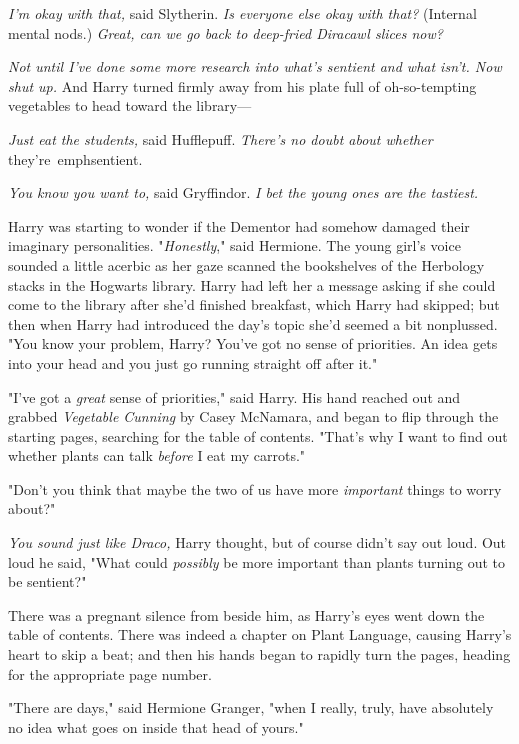 \emph{I'm okay with that,} said Slytherin. \emph{Is everyone else okay with 
that?} (Internal mental nods.) \emph{Great, can we go back to deep-fried 
Diracawl slices now?}

\emph{Not until I've done some more research into what's sentient and what 
isn't. Now shut up.} And Harry turned firmly away from his plate full of 
oh-so-tempting vegetables to head toward the library---

\emph{Just eat the students,} said Hufflepuff. \emph{There's no doubt about 
whether} they're\ emph{sentient.}

\emph{You know you want to,} said Gryffindor. \emph{I bet the young ones are 
the tastiest.}

Harry was starting to wonder if the Dementor had somehow damaged their 
imaginary personalities.
\sbreak
"\emph{Honestly}," said Hermione. The young girl's voice sounded a little 
acerbic as her gaze scanned the bookshelves of the Herbology stacks in the 
Hogwarts library. Harry had left her a message asking if she could come to the 
library after she'd finished breakfast, which Harry had skipped; but then when 
Harry had introduced the day's topic she'd seemed a bit nonplussed. "You know 
your problem, Harry? You've got no sense of priorities. An idea gets into your 
head and you just go running straight off after it."

"I've got a \emph{great} sense of priorities," said Harry. His hand reached out 
and grabbed \emph{Vegetable Cunning} by Casey McNamara, and began to flip 
through the starting pages, searching for the table of contents. "That's why I 
want to find out whether plants can talk \emph{before} I eat my carrots."

"Don't you think that maybe the two of us have more \emph{important} things to 
worry about?"

\emph{You sound just like Draco,} Harry thought, but of course didn't say out 
loud. Out loud he said, "What could \emph{possibly} be more important than 
plants turning out to be sentient?"

There was a pregnant silence from beside him, as Harry's eyes went down the 
table of contents. There was indeed a chapter on Plant Language, causing 
Harry's heart to skip a beat; and then his hands began to rapidly turn the 
pages, heading for the appropriate page number.

"There are days," said Hermione Granger, "when I really, truly, have absolutely 
no idea what goes on inside that head of yours."

